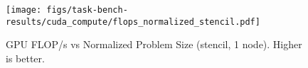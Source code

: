 \begin{figure}[t]
\centering
\texttt{[image: figs/task-bench-results/cuda\_compute/flops\_normalized\_stencil.pdf]}
\vspace{-0.5cm}
\caption{GPU FLOP/s vs Normalized Problem Size (stencil, 1 node). Higher is better.\label{fig:cuda-efficiency}}
\vspace{-0.05cm}
\end{figure}
